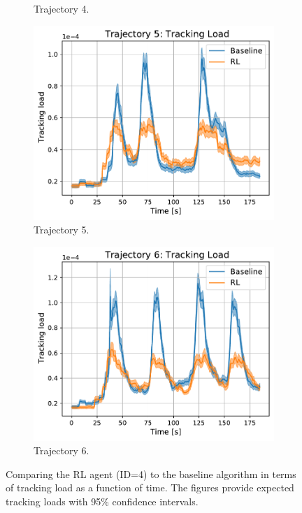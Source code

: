 \documentclass[english, 12pt, a4paper, elec, utf8, a-1b, online]{aaltothesis}
\numberwithin{equation}{section}
\begin{document}
\begin{figure}[h]
\begin{subfigure}[b]{0.45\textwidth}
        \caption{Trajectory 4.}
        \label{fig:TL_T4}
    \end{subfigure}
    \hfill
    \begin{subfigure}[b]{0.45\textwidth}
        \centering
        \includegraphics[width=\linewidth]{figures/benchmark/Simulations/tracking_load_4.pdf}
        \caption{Trajectory 5.}
        \label{fig:TL_T5}
    \end{subfigure}
    \hfill
    \begin{subfigure}[b]{0.45\textwidth}
        \centering
        \includegraphics[width=\linewidth]{figures/benchmark/Simulations/tracking_load_5.pdf}
        \caption{Trajectory 6.}
        \label{fig:TL_T6}
    \end{subfigure}
    \caption{Comparing the RL agent (ID=4) to the baseline algorithm in terms of tracking load as a function of time. The figures provide expected tracking loads with 95\% confidence intervals.}
    \label{fig:tracking_load_comparison}
\end{figure}
\end{document}
